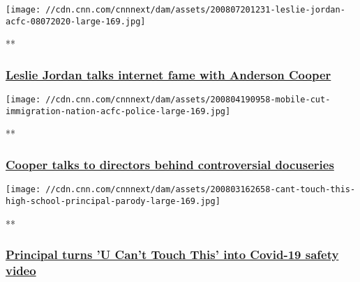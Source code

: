 \href{/videos/us/2020/08/07/leslie-jordan-quarantine-acfc-full-episode-vpx.cnn/video/playlists/acfc-full-episodes/}{}

\texttt{[image: //cdn.cnn.com/cnnnext/dam/assets/200807201231-leslie-jordan-acfc-08072020-large-169.jpg]}

**

\hypertarget{leslie-jordan-talks-internet-fame-with-anderson-cooper-1}{%
\subsubsection{\texorpdfstring{\href{/videos/us/2020/08/07/leslie-jordan-quarantine-acfc-full-episode-vpx.cnn/video/playlists/acfc-full-episodes/}{Leslie
Jordan talks internet fame with Anderson
Cooper}}{Leslie Jordan talks internet fame with Anderson Cooper}}\label{leslie-jordan-talks-internet-fame-with-anderson-cooper-1}}

\href{/videos/us/2020/08/04/immigration-nation-documentary-acfc-full-episode-vpx.cnn/video/playlists/acfc-full-episodes/}{}

\texttt{[image: //cdn.cnn.com/cnnnext/dam/assets/200804190958-mobile-cut-immigration-nation-acfc-police-large-169.jpg]}

**

\hypertarget{cooper-talks-to-directors-behind-controversial-docuseries}{%
\subsubsection{\texorpdfstring{\href{/videos/us/2020/08/04/immigration-nation-documentary-acfc-full-episode-vpx.cnn/video/playlists/acfc-full-episodes/}{Cooper
talks to directors behind controversial
docuseries}}{Cooper talks to directors behind controversial docuseries}}\label{cooper-talks-to-directors-behind-controversial-docuseries}}

\href{/videos/us/2020/08/03/school-reopening-principal-coronavirus-acfc-full-episode-vpx.cnn/video/playlists/acfc-full-episodes/}{}

\texttt{[image: //cdn.cnn.com/cnnnext/dam/assets/200803162658-cant-touch-this-high-school-principal-parody-large-169.jpg]}

**

\hypertarget{principal-turns-u-cant-touch-this-into-covid-19-safety-video}{%
\subsubsection{\texorpdfstring{\href{/videos/us/2020/08/03/school-reopening-principal-coronavirus-acfc-full-episode-vpx.cnn/video/playlists/acfc-full-episodes/}{Principal
turns 'U Can't Touch This' into Covid-19 safety
video}}{Principal turns 'U Can't Touch This' into Covid-19 safety video}}\label{principal-turns-u-cant-touch-this-into-covid-19-safety-video}}

